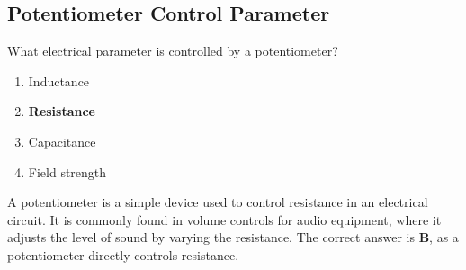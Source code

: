 \subsection{Potentiometer Control Parameter}
\label{T6A03}

\begin{tcolorbox}[colback=gray!10!white,colframe=black!75!black,title=T6A03]
What electrical parameter is controlled by a potentiometer?
\begin{enumerate}[noitemsep]
    \item Inductance
    \item \textbf{Resistance}
    \item Capacitance
    \item Field strength
\end{enumerate}
\end{tcolorbox}

A potentiometer is a simple device used to control resistance in an electrical circuit. It is commonly found in volume controls for audio equipment, where it adjusts the level of sound by varying the resistance. The correct answer is \textbf{B}, as a potentiometer directly controls resistance.